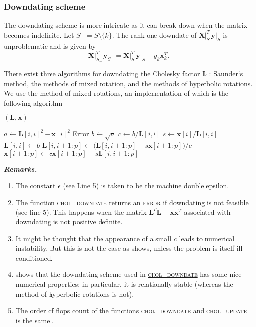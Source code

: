 \documentclass[a4paper,oneside,11pt,DIV=12]{scrartcl}
\begin{document}
\subsubsection{Downdating scheme}
The downdating scheme is more intricate as it can break down when the matrix becomes indefinite. Let $S_{-} = S \setminus \{k\}$. The rank-one downdate of $\bm X\vert_S^T \, \bm y\vert_S$ is unproblematic and is given by
\begin{equation}\label{eq:xtydowndate}
 	\bm X\vert_{S_-}^T \, \bm y_{S_-} = \bm X\vert_{S}^T \, \bm y \vert_S - y_k \bm x_k^T. 
\end{equation}

There exist three algorithms for downdating the Cholesky factor $\bm L$ \citep[][p. 355]{stewart_1998}: Saunder`s method, the methods of mixed rotation, and the methods of hyperbolic rotations. We use the method of mixed rotations, an implementation of which is the following algorithm \citep[][Algorithm 3.9]{stewart_1998}
\begin{algorithmic}[1]
	\hypertarget{alg:choldowndate}{$(\bm L, \bm x)$}
		\State $a \gets \bm L[i,i]^2 - \bm x[i]^2$
			\State \Return Error 
		\Else
			\State $b \gets \sqrt{a}$
		\EndIf
		\State $c \gets b/\bm L[i,i]$
		\State $s \gets \bm x[i] / \bm L[i,i]$
		\State $\bm L[i,i] \gets b$
		\State $\bm L[i, i+1:p] \gets \big( \bm L[i, i+1:p] - s \bm x[i+1:p]\big) / c$
		\State $\bm x[i+1:p] \gets c \bm x[i+1:p] - s \bm L[i, i+1:p]$
	\EndFor
	\EndFunction
\end{algorithmic}

\vspace{1em}
\noindent\textbf{\sffamily \small \itshape Remarks.}
\vspace{-0.5em}
\begin{enumerate}
	\item The constant $\epsilon$ (see Line 5) is taken to be the machine double epsilon. 
	\item The function  \hyperlink{alg:choldowndate}{\textsc{chol\_downdate}} returns an \textsc{error} if downdating is not feasible (see line 5). This happens when the matrix $\bm L^T \bm L - \bm x \bm x^T$ associated with downdating is not positive definite. 
	\item It might be thought that the appearance of a small $c$ leads to numerical instability. But this is not the case as \citet[][p. 346]{stewart_1998} shows, unless the problem is itself ill-conditioned. 
	\item \citet[][p. 352]{stewart_1998} shows that the downdating scheme used in  \hyperlink{alg:choldowndate}{\textsc{chol\_downdate}} has some nice numerical properties; in particular, it is relationally stable (whereas the method of hyperbolic rotations is not).
	\item The order of flops count of the functions \hyperlink{alg:choldowndate}{\textsc{chol\_downdate}} and \hyperlink{alg:cholupdate}{\textsc{chol\_update}} is the same \citep[][p. 346]{stewart_1998}. 
\end{enumerate}
\end{document}
